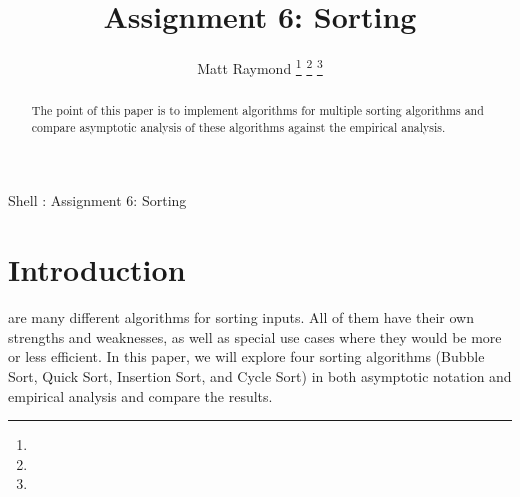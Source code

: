 \documentclass[journal]{IEEEtran}
\begin{document}
\title{Assignment 6: Sorting}
\author{Matt Raymond
\thanks{}%
\thanks{}%
\thanks{}}

%
{Shell \MakeLowercase{\textit{}}: Assignment 6: Sorting}

\maketitle

\begin{abstract}
The point of this paper is to implement algorithms for multiple sorting algorithms and compare asymptotic analysis of these algorithms against the empirical analysis.
\end{abstract}

\IEEEpeerreviewmaketitle

\section{Introduction}

 are many different algorithms for sorting inputs. All of them have their own strengths and weaknesses, as well as special use cases where they would be more or less efficient. In this paper, we will explore four sorting algorithms (Bubble Sort, Quick Sort, Insertion Sort, and Cycle Sort) in both asymptotic notation and empirical analysis and compare the results.
\end{document}
